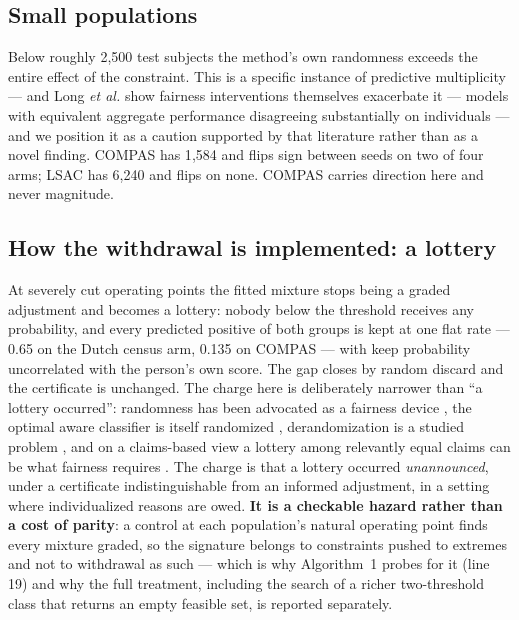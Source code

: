 \documentclass[conference]{IEEEtran}
\begin{document}
\subsection{Small populations}

Below roughly 2{,}500 test subjects the method's own randomness exceeds the entire effect of
the constraint. This is a specific instance of predictive multiplicity
\cite{black2022,long2023} --- and Long \emph{et al.} \cite{long2023} show fairness
interventions themselves exacerbate it ---
models with equivalent aggregate performance disagreeing substantially on individuals --- and
we position it as a caution supported by that literature rather than as a novel finding. COMPAS has 1{,}584 and flips sign between seeds on two of four arms; LSAC has
6{,}240 and flips on none. COMPAS carries direction here and never magnitude.

\subsection{How the withdrawal is implemented: a lottery}
\label{sec:lottery}

At severely cut operating points the fitted mixture stops being a graded adjustment and
becomes a lottery: nobody below the threshold receives any probability, and every predicted
positive of both groups is kept at one flat rate --- 0.65 on the Dutch census arm, 0.135 on
COMPAS --- with keep probability uncorrelated with the person's own score. The gap closes by random discard and the certificate is unchanged. The charge here is
deliberately narrower than ``a lottery occurred'': randomness has been advocated as a fairness
device \cite{grgic2017}, the optimal aware classifier is itself randomized
\cite{agarwal2022}, derandomization is a studied problem \cite{cotter2019}, and on a
claims-based view a lottery among relevantly equal claims can be what fairness requires
\cite{stone2011}. The charge is that a lottery occurred \emph{unannounced}, under a
certificate indistinguishable from an informed adjustment, in a setting where individualized
reasons are owed. \textbf{It is a checkable hazard rather than a cost of parity}: a control at
each population's natural operating point finds every mixture graded, so the signature belongs
to constraints pushed to extremes and not to withdrawal as such --- which is why Algorithm~1
probes for it (line 19) and why the full treatment, including the search of a richer
two-threshold class that returns an empty feasible set, is reported separately.
\end{document}
